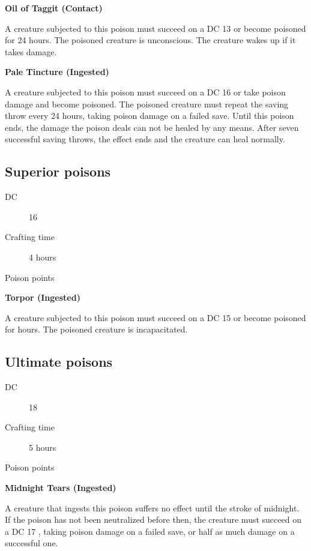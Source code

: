 \textbf{Oil of Taggit (Contact)}

A creature subjected to this poison must succeed on a DC 13 \constitutionsave or become poisoned for 24 hours. The poisoned creature is unconscious. The creature wakes up if it takes damage.

\textbf{Pale Tincture (Ingested)}

A creature subjected to this poison must succeed on a DC 16 \constitutionsave or take  poison damage and become poisoned. The poisoned creature must repeat the saving throw every 24 hours, taking  poison damage on a failed save. Until this poison ends, the damage the poison deals can not be healed by any means. After seven successful saving throws, the effect ends and the creature can heal normally.

\subsection{Superior poisons}

\begin{description}
\item [DC] 16 \nature
\item [Crafting time] 4 hours
\item [Poison points] \poison\poison\poison\poison
\end{description}

\textbf{Torpor (Ingested)}

A creature subjected to this poison must succeed on a DC 15 \constitutionsave or become poisoned for  hours. The poisoned creature is incapacitated.

\subsection{Ultimate poisons}

\begin{description}
\item [DC] 18 \nature
\item [Crafting time] 5 hours
\item [Poison points] \poison\poison\poison\poison\poison
\end{description}

\textbf{Midnight Tears (Ingested)}

A creature that ingests this poison suffers no effect until the stroke of midnight. If the poison has not been neutralized before then, the creature must succeed on a DC 17 \constitutionsave, taking  poison damage on a failed save, or half as much damage on a successful one.

